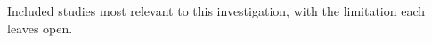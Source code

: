 \begin{table}[t]
\centering
\small
\caption{Included studies most relevant to this investigation, with the limitation each leaves open.}\label{tab:related}

\end{table}
